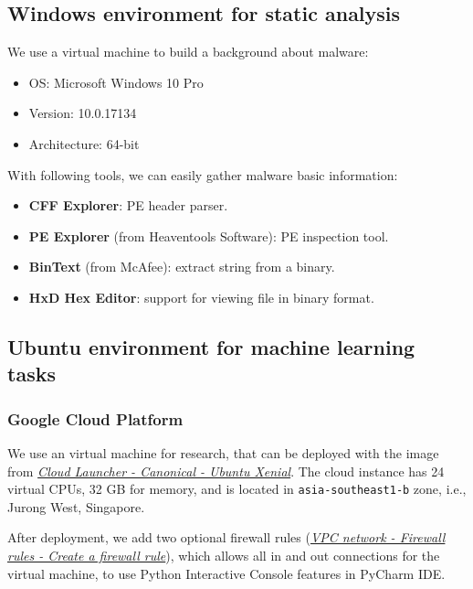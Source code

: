 \subsection{Windows environment for static analysis}

We use a virtual machine to build a background about malware:

\begin{itemize}
\item OS: Microsoft Windows 10 Pro
\item Version: 10.0.17134
\item Architecture: 64-bit
\end{itemize}

With following tools, we can easily gather malware basic information:

\begin{itemize}
 \item \textbf{CFF Explorer}: PE header parser.
 \item \textbf{PE Explorer} (from Heaventools Software): PE inspection tool.
 \item \textbf{BinText} (from McAfee): extract string from a binary.
 \item \textbf{HxD Hex Editor}: support for viewing file in binary format.
\end{itemize}

\subsection{Ubuntu environment for machine learning tasks}

\subsubsection{Google Cloud Platform}

We use an virtual machine for research, that can be deployed with the image from \textit{\href{https://console.cloud.google.com/launcher/details/ubuntu-os-cloud/ubuntu-xenial}{Cloud Launcher - Canonical - Ubuntu Xenial}}. The cloud instance has 24 virtual CPUs, 32 GB for memory, and is located in \verb|asia-southeast1-b| zone, i.e., Jurong West, Singapore.

After deployment, we add two optional firewall rules (\textit{\href{https://console.cloud.google.com/networking/firewalls/add}{VPC network - Firewall rules - Create a firewall rule}}), which allows all in and out connections for the virtual machine, to use Python Interactive Console features in PyCharm IDE.

